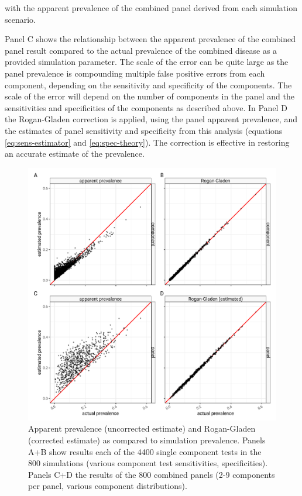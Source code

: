 \documentclass[a4paper, 12pt, twoside]{article}
\begin{document}
with the apparent prevalence of the combined panel derived from each simulation scenario.

Panel C shows the relationship between the apparent prevalence of the combined panel result compared to the actual prevalence of the combined disease as a provided simulation parameter. The scale of the error can be quite large as the panel prevalence is compounding multiple false positive errors from each component, depending on the sensitivity and specificity of the components. The scale of the error will depend on the number of components in the panel and the sensitivities and specificities of the components as described above. In Panel D the Rogan-Gladen correction is applied, using the panel apparent prevalence, and the estimates of panel sensitivity and specificity from this analysis (equations  \eqref{eq:sens-estimator} and  \eqref{eq:spec-theory}). The correction is effective in restoring an accurate estimate of the prevalence.

\begin{figure}[h!]
\centering
  \includegraphics{fig/qq-prevalence-prediction-v-simulation.png}
  \caption{Apparent prevalence (uncorrected estimate) and Rogan-Gladen (corrected estimate) as compared to simulation prevalence. Panels A+B show results each of the 4400 single component tests in the 800 simulations (various component test sensitivities, specificities). Panels C+D the results of the 800 combined panels (2-9 components per panel, various component distributions).}
\label{fig:A3}
\end{figure}
\end{document}
